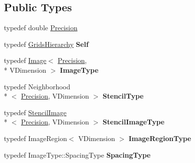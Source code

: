 \subsection*{Public Types}
\begin{DoxyCompactItemize}
\item 
typedef double \hyperlink{classitk_1_1mad_1_1_grids_hierarchy_a235005f48422caf216820d2d6b77ca0a}{Precision}
\item 
\hypertarget{classitk_1_1mad_1_1_grids_hierarchy_a4ab641bfee5c8ea9389f304ccd23549f}{typedef \hyperlink{classitk_1_1mad_1_1_grids_hierarchy}{Grids\-Hierarchy} {\bfseries Self}}\label{classitk_1_1mad_1_1_grids_hierarchy_a4ab641bfee5c8ea9389f304ccd23549f}

\item 
\hypertarget{classitk_1_1mad_1_1_grids_hierarchy_a2fee3ed525b2cdf4242351e30f6cce52}{typedef \hyperlink{class_image}{Image}$<$ \hyperlink{classitk_1_1mad_1_1_grids_hierarchy_a235005f48422caf216820d2d6b77ca0a}{Precision}, \\*
V\-Dimension $>$ {\bfseries Image\-Type}}\label{classitk_1_1mad_1_1_grids_hierarchy_a2fee3ed525b2cdf4242351e30f6cce52}

\item 
\hypertarget{classitk_1_1mad_1_1_grids_hierarchy_ac4d01a308c9990adba91abca78a02801}{typedef Neighborhood\\*
$<$ \hyperlink{classitk_1_1mad_1_1_grids_hierarchy_a235005f48422caf216820d2d6b77ca0a}{Precision}, V\-Dimension $>$ {\bfseries Stencil\-Type}}\label{classitk_1_1mad_1_1_grids_hierarchy_ac4d01a308c9990adba91abca78a02801}

\item 
\hypertarget{classitk_1_1mad_1_1_grids_hierarchy_a2417f54fc9001fb7e239e2472c2249a9}{typedef \hyperlink{classitk_1_1mad_1_1_stencil_image}{Stencil\-Image}\\*
$<$ \hyperlink{classitk_1_1mad_1_1_grids_hierarchy_a235005f48422caf216820d2d6b77ca0a}{Precision}, V\-Dimension $>$ {\bfseries Stencil\-Image\-Type}}\label{classitk_1_1mad_1_1_grids_hierarchy_a2417f54fc9001fb7e239e2472c2249a9}

\item 
\hypertarget{classitk_1_1mad_1_1_grids_hierarchy_ab7ed42a7ff14b5a2664efdc50a7505b4}{typedef Image\-Region$<$ V\-Dimension $>$ {\bfseries Image\-Region\-Type}}\label{classitk_1_1mad_1_1_grids_hierarchy_ab7ed42a7ff14b5a2664efdc50a7505b4}

\item 
\hypertarget{classitk_1_1mad_1_1_grids_hierarchy_a48978a328db24d5c9aa98c1fe5faca1f}{typedef Image\-Type\-::\-Spacing\-Type {\bfseries Spacing\-Type}}\label{classitk_1_1mad_1_1_grids_hierarchy_a48978a328db24d5c9aa98c1fe5faca1f}


\end{DoxyCompactItemize}
